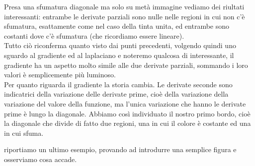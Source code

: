 Presa una sfumatura diagonale ma solo su metà immagine vediamo dei riultati interessanti: entrambe le derivate parziali sono nulle nelle regioni in cui non c'è sfumatura, esattamente come nel caso della tinta unita, ed entrambe sono costanti dove c'è sfumatura (che ricordiamo essere lineare).\\
Tutto ciò riconferma quanto visto dai punti precedenti, volgendo quindi uno sguardo al gradiente ed al laplaciano e noteremo qualcosa di interessante, il gradiente ha un aspetto molto simile alle due derivate parziali, sommando i loro valori è semplicemente più luminoso.\\
Per quanto riguarda il gradiente la storia cambia. Le derivate seconde sono indicatrici della variazione delle derivate prime, cioè della variazione della variazione del valore della funzione, ma l'unica variazione che hanno le derivate prime è lungo la diagonale.
Abbiamo così individuato il nostro primo bordo, cioè la diagonale che divide di fatto due regioni, una in cui il colore è costante ed una in cui sfuma.\\

\vspace{1em}

riportiamo un ultimo esempio, provando ad introdurre una semplice figura e osserviamo cosa accade.\\

